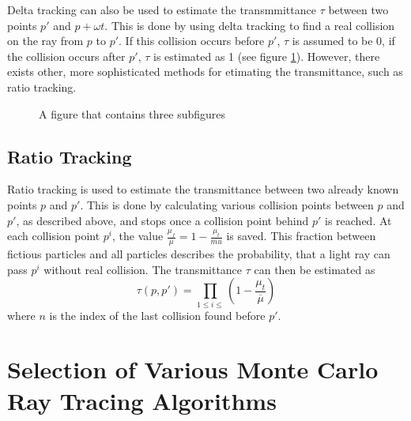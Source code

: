 Delta tracking can also be used to estimate the transmmittance $\tau$ between two points $p'$ and $p + \omega t$. This is done by using delta tracking to find a real collision on the ray from $p$ to $p'$. If this collision occurs before $p'$, $\tau$ is assumed to be 0, if the collision occurs after $p'$, $\tau$ is estimated as 1 (see figure \ref{fig:delta_tracking_distance}). However, there exists other, more sophisticated methods for etimating the transmittance, such as ratio tracking.

\begin{figure}
  \begin{subfigure}{0.49\textwidth}
    
  \end{subfigure}%
  \hspace*{\fill}   %
  \begin{subfigure}{0.49\textwidth}
   
  \end{subfigure}%

\caption{A figure that contains three subfigures} \label{fig:delta_tracking_distance}
\end{figure}

\subsection{Ratio Tracking}
Ratio tracking is used to estimate the transmittance between two already known points $p$ and $p'$. This is done by calculating various collision points between $p$ and $p'$, as described above, and stops once a collision point behind $p'$ is reached. At each collision point $p^i$, the value $\frac{\mu_f}{\overline{\mu}} = 1 - \frac{\mu_t}{\overline{mu}}$ is saved. This fraction between fictious particles and all particles describes the probability, that a light ray can pass $p^i$ without real collision. The transmittance $\tau$ can then be estimated as 
\begin{equation}
\tau(p,p') = \prod_{1 \le i \le}(1 - \frac{\mu_t}{\overline{\mu}})
\end{equation}
where $n$ is the index of the last collision found before $p'$.
\section{Selection of Various Monte Carlo Ray Tracing Algorithms}
